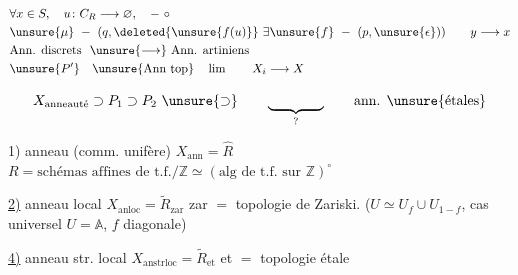 \[
\begin{aligned}
 &\forall x\in S,\quad u\colon C_R\longrightarrow \varnothing,\quad -\ \circ\\
 &\unsure{\mu}\ -\ (q,\deleted{\unsure{f(u)}}\ \exists\unsure{f}\ -\ (p,\unsure{\epsilon}))\qquad y\longrightarrow x\\
 &\text{Ann. discrets }\ \unsure{\longrightarrow}\ \text{Ann. artiniens}\\
 &\unsure{P'}\quad\unsure{\text{Ann top}}\quad \lim\qquad X_i\longrightarrow X
\end{aligned}
\]

\[
 X_{\text{anneauté}}\supset P_1\supset P_2\ \unsure{\supset}\qquad \underbrace{\hspace{1.4cm}}_{?}
 \qquad\text{ann. \unsure{étales}}
\]




1) anneau (comm. unifère) \quad $X_{\mathrm{ann}}=\widehat R$\quad
$R=\text{schémas affines de t.f.}/\mathbb Z\simeq(\text{alg de t.f. sur }\mathbb Z)^\circ$

\uline{2)} anneau local \quad $X_{\mathrm{anloc}}=\widetilde R_{\mathrm{zar}}$ \quad zar $=$ topologie de Zariski.
($U\simeq U_f\cup U_{1-f}$, cas universel $U=\mathbb A$, $f$ diagonale)

\uline{4)} anneau str. local \quad $X_{\mathrm{anstrloc}}=\widetilde R_{\mathrm{et}}$ \quad et $=$ topologie étale

